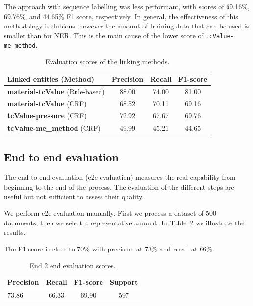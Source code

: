 \documentclass{article}
\begin{document}
The approach with sequence labelling was less performant, with scores of 69.16\%, 69.76\%, and 44.65\% F1 score, respectively. In general, the effectiveness of this methodology is dubious, however the amount of training data that can be used is smaller than for NER. 
This is the main cause of the lower score of \texttt{tcValue-me\_method}. 


\begin{table}[ht]
\centering
\begin{tabular}{lccc}
\hline \textbf{Linked entities} (Method) & \textbf{Precision} & \textbf{Recall} & \textbf{F1-score} \\ \hline
\textbf{material-tcValue} (Rule-based)  & 88.00 	&   74.00      &	81.00      \\
\textbf{material-tcValue} (CRF)         & 68.52 &	70.11   &  69.16    \\
\textbf{tcValue-pressure} (CRF)         & 72.92 &	67.67   &  69.76    \\
\textbf{tcValue-me\_method} (CRF)       & 49.99 &	45.21   &  44.65   \\
\hline
\end{tabular}
\label{table:evaluation-linking}
\caption{Evaluation scores of the linking methods. }
\end{table}

\subsection{End to end evaluation}

The end to end evaluation (e2e evaluation) measures the real capability from beginning to the end of the process. The evaluation of the different steps are useful but not sufficient to assess their quality. 

We perform e2e evaluation manually. First we process a dataset of 500 documents, then we select a representative amount. In Table~\ref{table:end2end-evaluation} we illustrate the results. 

The F1-score is close to 70\% with precision at 73\% and recall at 66\%.

\begin{table}[ht]
\centering
\begin{tabular}{lccc}
\hline \textbf{Precision} & \textbf{Recall} & \textbf{F1-score} & \textbf{Support} \\ \hline
73.86  &	66.33 &	69.90 & 597\\
\hline
\end{tabular}
\label{table:end2end-evaluation}
\caption{End 2 end evaluation scores. }
\end{table}
\end{document}

